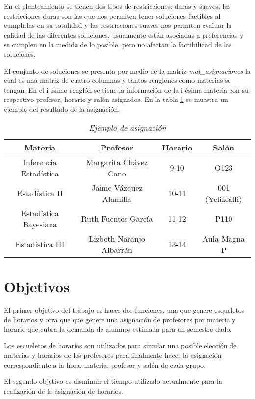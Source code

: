En el planteamiento se tienen dos tipos de restricciones: duras y suaves, las restricciones duras son las que nos permiten tener soluciones factibles al cumplirlas en su totalidad y las restricciones suaves nos permiten evaluar la calidad de las diferentes soluciones, usualmente están asociadas a preferencias y se cumplen en la medida de lo posible, pero no afectan la factibilidad de las soluciones.

El conjunto de soluciones se presenta por medio de la matriz \textit{mat\_asignaciones} la cual es una matriz de cuatro columnas y tantos renglones como materias se tengan. En el i-ésimo renglón se tiene la información de la i-ésima materia con su respectivo profesor, horario y salón asignados. En la tabla \ref{EjAsig} se muestra un ejemplo del resultado de la asignación.

\begin{table}[h]
\centering
\begin{tabular}{|c|c|c|c|}
 \hline 
 Materia & Profesor & Horario & Salón \\ 
 \hline 
 Inferencia Estadística & Margarita Chávez Cano & 9-10 & O123 \\ 
 \hline 
 Estadística II & Jaime Vázquez Alamilla & 10-11 & 001 (Yelizcalli) \\ 
 \hline 
 Estadística Bayesiana  & Ruth Fuentes García & 11-12 & P110 \\ 
 \hline 
 Estadística III  & Lizbeth Naranjo Albarrán & 13-14 & Aula Magna P \\ 
 \hline 
 \end{tabular}  
\caption{\textit{Ejemplo de asignación}}\label{EjAsig}
\end{table}


\section{Objetivos}

El primer objetivo del trabajo es hacer dos funciones, una que genere esqueletos de horarios y otra que que genere una asignación de profesores por materia y horario que cubra la demanda de alumnos estimada para un semestre dado.

Los esqueletos de horarios son utilizados para simular una posible elección de materias y horarios de los profesores para finalmente hacer la asignación correspondiente a la hora, materia, profesor y salón de cada grupo.

El segundo objetivo es disminuir el tiempo utilizado actualmente para la realización de la asignación de horarios.


